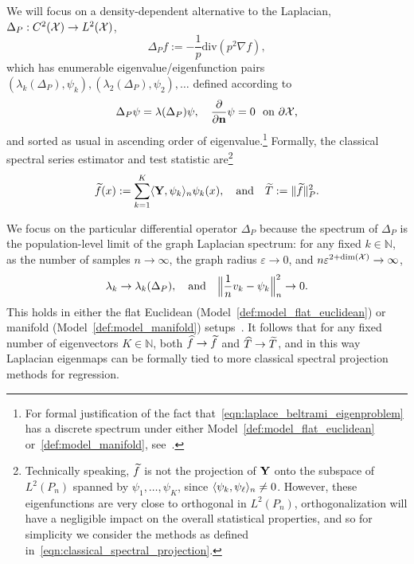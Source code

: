We will focus on a density-dependent alternative to the Laplacian,  $\Delta_P:C^2(\mathcal{X}) \to L^2(\mathcal{X})$,
\begin{equation}
\label{eqn:laplace_beltrami}
\Delta_Pf := -\frac{1}{p} \mathrm{div}(p^2\nabla f),
\end{equation}
which has enumerable eigenvalue/eigenfunction pairs $(\lambda_k(\Delta_P),\psi_k),(\lambda_2(\Delta_P),\psi_2),\ldots$ defined according to
\begin{equation}
\label{eqn:laplace_beltrami_eigenproblem}
\Delta_P\psi = \lambda(\Delta_P) \psi, \quad \frac{\partial}{\partial{\bf n}}\psi = 0~~\textrm{on $\partial \mathcal{X}$,}
\end{equation}
and sorted as usual in ascending order of eigenvalue.\footnote{For formal justification of the fact that~\eqref{eqn:laplace_beltrami_eigenproblem} has a discrete spectrum under either Model~\ref{def:model_flat_euclidean} or~\ref{def:model_manifold}, see~\cite{garciatrillos18,trillos2019}.} Formally, the classical spectral series estimator and test statistic are\footnote{Technically speaking, $\widetilde{f}$ is not the projection of ${\bf Y}$ onto the subspace of $L^2(P_n)$ spanned by $\psi_1,\ldots,\psi_K$, since $\langle \psi_k, \psi_{\ell} \rangle_n \neq 0$. However, these eigenfunctions are very close to orthogonal in $L^2(P_n)$, orthogonalization will have a negligible impact on the overall statistical properties, and so for simplicity we consider the methods as defined in~\eqref{eqn:classical_spectral_projection}.}
\begin{equation}
\label{eqn:classical_spectral_projection}
\widetilde{f}(x) := \sum_{k = 1}^{K} \langle {\bf Y}, \psi_k \rangle_{n} \psi_k(x),\quad\textrm{and}\quad \widetilde{T} := \|\widetilde{f}\|_P^2.
\end{equation}

We focus on the particular differential operator $\Delta_P$ because the spectrum of $\Delta_P$ is the population-level limit of the graph Laplacian spectrum: for any fixed $k \in \mathbb{N}$, as the number of samples $n \to \infty$, the graph radius $\varepsilon \to 0$, and $n\varepsilon^{2 + \dim(\mathcal{X})} \to \infty$,
\begin{equation}
\lambda_k \to \lambda_k(\Delta_P), \quad\textrm{and}\quad \Bigl\|\frac{1}{n}v_k - \psi_k\Bigr\|_n^2 \to 0.
\end{equation}
This holds in either the flat Euclidean (Model~\ref{def:model_flat_euclidean}) or manifold (Model~\ref{def:model_manifold}) setups~\citep{garciatrillos18,trillos2019}. It follows that for any fixed number of eigenvectors $K \in \mathbb{N}$, both $\widehat{f} \to \widetilde{f}$ and $\widehat{T} \to \widetilde{T}$, and in this way Laplacian eigenmaps can be formally tied to more classical spectral projection methods for regression.

